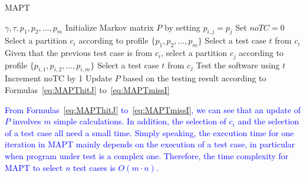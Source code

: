 \documentclass[10pt,journal,compsoc]{IEEEtran}
\begin{document}
\begin{algorithm}
	\caption{MAPT}
	\label{alg:MAPT}
	\begin{algorithmic}[1]
		\renewcommand{\algorithmicrequire}{\textbf{Input:}}
		\renewcommand{\algorithmicensure}{\textbf{Output:}}
		\renewcommand{\algorithmicendwhile}{\algorithmicend\_\algorithmicwhile}
		\renewcommand{\algorithmicendfor}{\algorithmicend\_\algorithmicfor}
		\renewcommand{\algorithmicendif}{\algorithmicend\_\algorithmicif}
		\renewcommand{\algorithmicthen}{}
		\renewcommand{\algorithmicdo}{}
		\REQUIRE $\gamma, \tau, p_1, p_2, \ldots, p_m$
		\STATE Initialize Markov matrix $P$ by setting $p_{i,j} = p_j$
		\STATE Set $noTC = 0$
		\STATE Select a partition $c_i$ according to profile $\{p_1, p_2, \ldots, p_m\}$
		\STATE Select a test case $t$ from $c_i$
		\ELSE
		\STATE Given that the previous test case is from $c_i$, select a partition $c_j$ according to profile $\{p_{i,1}, p_{i,2}, \ldots, p_{i,m}\}$
		\STATE Select a test case $t$ from $c_j$
		\ENDIF
		\STATE Test the software using $t$
		\STATE Increment noTC by 1
		\STATE Update $P$ based on the testing result according to Formulas~\ref{eq:MAPThitJ} to~\ref{eq:MAPTmissI}
		\ENDWHILE
	\end{algorithmic}
\end{algorithm}

\textcolor{blue}{From Formulas~\ref{eq:MAPThitJ} to~\ref{eq:MAPTmissI}, we can see that an update of $P$ involves $m$ simple calculations. In addition, the selection of $c_i$ and the selection of a test case all need a small time. Simply speaking, the execution time for one iteration in MAPT mainly depends on the execution of a test case, in particular when program under test is a complex one. Therefore, the time complexity for MAPT to select $n$ test cases is $O(m \cdot n)$. }

\end{document}
